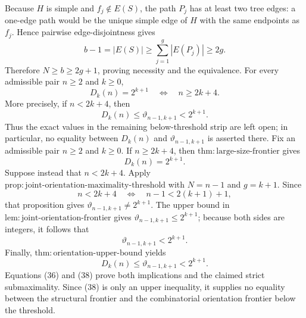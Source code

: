 Because \(H\) is simple and \(f_j\notin E(S)\), the path \(P_j\) has at least two tree edges: a one-edge path would be the unique simple edge of \(H\) with the same endpoints as \(f_j\).  Hence pairwise edge-disjointness gives
\[
 b-1=|E(S)|\geq\sum_{j=1}^g|E(P_j)|\geq2g.
\tag{35}
\]
Therefore \(N\geq b\geq2g+1\), proving necessity and the equivalence.
For every admissible pair \(n\geq2\) and \(k\geq0\),
\[
 D_k(n)=2^{k+1}
 \quad\Longleftrightarrow\quad
 n\geq2k+4.
\]
More precisely, if \(n<2k+4\), then
\[
 D_k(n)\leq\vartheta_{n-1,k+1}<2^{k+1}.
\]
Thus the exact values in the remaining below-threshold strip are left open; in particular, no equality between \(D_k(n)\) and \(\vartheta_{n-1,k+1}\) is asserted there.
Fix an admissible pair \(n\geq2\) and \(k\geq0\).  If \(n\geq2k+4\), then \(\mathrm{thm:large\mbox{-}size\mbox{-}frontier}\) gives
\[
 D_k(n)=2^{k+1}.
\tag{36}
\]
Suppose instead that \(n<2k+4\).  Apply \(\mathrm{prop:joint\mbox{-}orientation\mbox{-}maximality\mbox{-}threshold}\) with \(N=n-1\) and \(g=k+1\).  Since
\[
 n<2k+4
 \quad\Longleftrightarrow\quad
 n-1<2(k+1)+1,
\]
that proposition gives \(\vartheta_{n-1,k+1}\ne2^{k+1}\).  The upper bound in \(\mathrm{lem:joint\mbox{-}orientation\mbox{-}frontier}\) gives \(\vartheta_{n-1,k+1}\leq2^{k+1}\); because both sides are integers, it follows that
\[
 \vartheta_{n-1,k+1}<2^{k+1}.
\tag{37}
\]
Finally, \(\mathrm{thm:orientation\mbox{-}upper\mbox{-}bound}\) yields
\[
 D_k(n)\leq\vartheta_{n-1,k+1}<2^{k+1}.
\tag{38}
\]
Equations (36) and (38) prove both implications and the claimed strict submaximality.  Since (38) is only an upper inequality, it supplies no equality between the structural frontier and the combinatorial orientation frontier below the threshold.
